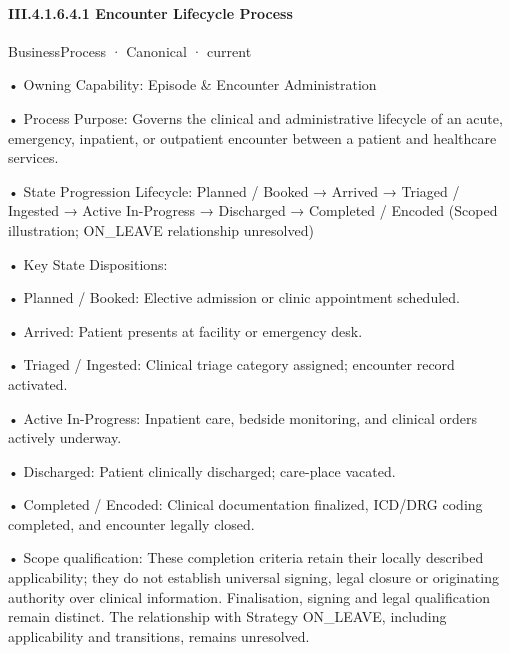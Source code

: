 \paragraph*{III.4.1.6.4.1 Encounter Lifecycle Process}
\label{navigation:III.4.1.6.4.1}

\label{element:df49e2e8bb3748f3abbdd1c28ae1be8f}
{\small BusinessProcess · Canonical · current}\par

•
Owning Capability: Episode \& Encounter Administration



•
Process Purpose: Governs the clinical and administrative lifecycle of an acute, emergency, inpatient, or outpatient encounter between a patient and healthcare services.



•
State Progression Lifecycle: Planned / Booked → Arrived → Triaged / Ingested → Active In-Progress → Discharged → Completed / Encoded   (Scoped illustration; ON\_LEAVE relationship unresolved)



•
Key State Dispositions:



•
Planned / Booked: Elective admission or clinic appointment scheduled.



•
Arrived: Patient presents at facility or emergency desk.



•
Triaged / Ingested: Clinical triage category assigned; encounter record activated.



•
Active In-Progress: Inpatient care, bedside monitoring, and clinical orders actively underway.



•
Discharged: Patient clinically discharged; care-place vacated.



•
Completed / Encoded: Clinical documentation finalized, ICD/DRG coding completed, and encounter legally closed.



•
Scope qualification: These completion criteria retain their locally described applicability; they do not establish universal signing, legal closure or originating authority over clinical information. Finalisation, signing and legal qualification remain distinct. The relationship with Strategy ON\_LEAVE, including applicability and transitions, remains unresolved.



